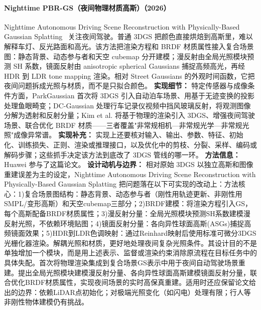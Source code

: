 \paragraph{Nighttime PBR-GS（夜间物理材质高斯）（2026）}
Nighttime Autonomous Driving Scene Reconstruction with Physically-Based Gaussian Splatting~\cite{2602_13549} 关注夜间驾驶。普通 3DGS 把颜色直接烘焙到高斯里，难以解释车灯、反光路面和高光。该方法把渲染方程和 BRDF 材质属性接入复合场景图：静态背景、动态参与者和天空 cubemap 分开建模；漫反射由全局光照模块预测 SH 系数，镜面反射由 anisotropic spherical Gaussians 捕捉高频高光，再经 HDR 到 LDR tone mapping 渲染。相对 Street Gaussians 的外观时间函数，它把夜间问题拆成光照与材质，而不是只拟合颜色。
\textbf{实现细节：} 特定传感器与成像条件方面，ParkGaussian 首次将 3DGS 引入自动泊车场景、用基于无迹变换的投影处理鱼眼畸变；DC-Gaussian 处理行车记录仪视频中挡风玻璃反射，将观测图像分解为透射和反射分量；Kim et al. 将基于物理的渲染引入 3DGS、增强夜间驾驶场景、联合优化 BRDF 材质——三者覆盖"非常规相机—非常规光学—非常规光照"成像异常谱。
\textbf{实现补充：} 实现上还要核对输入、输出、参数、特征、初始化、训练损失、正则、渲染或推理接口，以及优化中的剪枝、分裂、采样、编码或解码步骤；这些抓手决定该方法到底改了 3DGS 管线的哪一环。
\textbf{方法信息：} Huawei 参与了这篇论文。
\textbf{设计动机与边界：} 相对原始 3DGS 以独立高斯和图像重建误差为主的设定，Nighttime Autonomous Driving Scene Reconstruction with Physically-Based Gaussian Splatting 把问题落在以下可实现的改动上：方法核心：1)复合场景图结构：静态背景、动态参与者（刚性用轨迹更新、非刚性用SMPL/变形高斯）和天空cubemap三部分；2)BRDF建模：将渲染方程引入GS，每个高斯配备BRDF材质属性；3)漫反射分量：全局光照模块预测SH系数建模漫反射光照，不依赖环境贴图；4)镜面反射分量：各向异性球面高斯(ASGs)捕捉高频镜面效果；5)HDR到LDR色调映射：通过Reinhard映射后使用标准可微分3DGS光栅化器渲染。解耦光照和材质，更好地处理夜间复杂光照条件。其设计目的不是单独增加一个模块，而是用上述表示、监督或渲染约束消除原流程在目标任务中的具体失配。首次将物理渲染集成到复合场景GS表示中用于夜间自动驾驶场景重建。提出全局光照模块建模漫反射分量、各向异性球面高斯建模镜面反射分量，联合优化BRDF材质属性，实现夜间场景的实时高保真重建。适用时还应保留论文给出的边界：依赖LiDAR点初始化；对极端光照变化（如闪电）处理有限；行人等非刚性物体建模仍有挑战。
